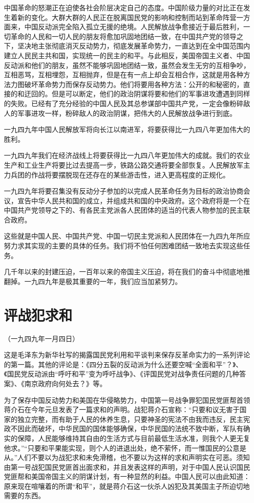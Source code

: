 \documentclass[UTF-8, a5paper, 12pt]{ctexart}
\begin{document}
中国革命的怒潮正在迫使各社会阶层决定自己的态度。中国阶级力量的对比正在发生着新的变化。大群大群的人民正在脱离国民党的影响和控制而站到革命阵营一方面来，中国反动派完全陷入孤立无援的绝境。人民解放战争愈接近于最后胜利，一切革命的人民和一切人民的朋友将愈加巩固地团结一致，在中国共产党的领导之下，坚决地主张彻底消灭反动势力，彻底发展革命势力，一直达到在全中国范围内建立人民民主共和国，实现统一的民主的和平。与此相反，美国帝国主义者、中国反动派和他们的朋友，虽然不能够巩固地团结一致，虽然会发生无穷的互相争吵，互相恶骂，互相埋怨，互相抛弃，但是在有一点上却会互相合作，这就是用各种方法力图破坏革命势力而保存反动势力。他们将要用各种方法：公开的和秘密的，直接的和迂回的。但是可以断定，他们的政治阴谋将要和他们的军事进攻遭遇到同样的失败。已经有了充分经验的中国人民及其总参谋部中国共产党，一定会像粉碎敌人的军事进攻一样，粉碎敌人的政治阴谋，把伟大的人民解放战争进行到底。

一九四九年中国人民解放军将向长江以南进军，将要获得比一九四八年更加伟大的胜利。

一九四九年我们在经济战线上将要获得比一九四八年更加伟大的成就。我们的农业生产和工业生产将要比过去提高一步，铁路公路交通将要全部恢复。人民解放军主力兵团的作战将要摆脱现在还存在的某些游击性，进入更高程度的正规化。

一九四九年将要召集没有反动分子参加的以完成人民革命任务为目标的政治协商会议，宣告中华人民共和国的成立，并组成共和国的中央政府。这个政府将是一个在中国共产党领导之下的、有各民主党派各人民团体的适当的代表人物参加的民主联合政府。

这些就是中国人民、中国共产党、中国一切民主党派和人民团体在一九四九年所应努力求其实现的主要的具体的任务。我们将不怕任何困难团结一致地去实现这些任务。

几千年以来的封建压迫，一百年以来的帝国主义压迫，将在我们的奋斗中彻底地推翻掉。一九四九年是极其重要的一年，我们应当加紧努力。


\section{评战犯求和}

（一九四九年一月四日）

这是毛泽东为新华社写的揭露国民党利用和平谈判来保存反革命实力的一系列评论的第一篇。其他的评论是：《四分五裂的反动派为什么还要空喊“全面和平”？》、《国民党反动派由“呼吁和平”变为呼吁战争》、《评国民党对战争责任问题的几种答案》、《南京政府向何处去？》等。

为了保存中国反动势力和美国在华侵略势力，中国第一号战争罪犯国民党匪帮首领蒋介石在今年元旦发表了一篇求和的声明。战犯蒋介石宣称：“只要和议无害于国家的独立完整，而有助于人民的休养生息，只要神圣的宪法不由我而违反，民主宪政不因此而破坏，中华民国的国体能够确保，中华民国的法统不致中断，军队有确实的保障，人民能够维持其自由的生活方式与目前最低生活水准，则我个人更无复他求。”“只要和平果能实现，则个人的进退出处，绝不萦怀，而一惟国民的公意是从。”人们不要以为战犯求和未免滑稽，也不要以为这样的求和声明实在可恶。须知由第一号战犯国民党匪首出面求和，并且发表这样的声明，对于中国人民认识国民党匪帮和美国帝国主义的阴谋计划，有一种显然的利益。中国人民可以由此知道：原来现在喧嚷着的所谓“和平”，就是蒋介石这一伙杀人凶犯及其美国主子所迫切地需要的东西。
\end{document}
